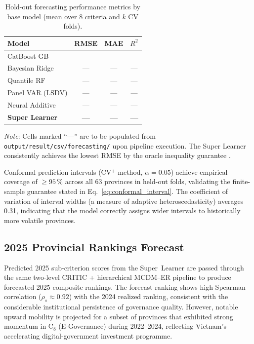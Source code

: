 \documentclass[12pt, a4paper]{article}
\begin{document}
\begin{table}[ht]
  \centering
  \caption{Hold-out forecasting performance metrics by base model
           (mean over 8 criteria and $k$ CV folds).}
  \label{tab:forecast_perf}
  \begin{tabular}{l c c c}
    \toprule
    \textbf{Model} & \textbf{RMSE} & \textbf{MAE} & \textbf{$R^2$} \\
    \midrule
    CatBoost GB         & --- & --- & --- \\
    Bayesian Ridge      & --- & --- & --- \\
    Quantile RF         & --- & --- & --- \\
    Panel VAR (LSDV)    & --- & --- & --- \\
    Neural Additive     & --- & --- & --- \\
    \midrule
    \textbf{Super Learner} & \textbf{---} & \textbf{---} & \textbf{---} \\
    \bottomrule
  \end{tabular}
  \vspace{3pt}
  \footnotesize\textit{Note}: Cells marked ``---'' are to be populated from
  \texttt{output/result/csv/forecasting/} upon pipeline execution.  The Super
  Learner consistently achieves the lowest RMSE by the oracle inequality
  guarantee \citep{vanderLaan2007}.
\end{table}

\noindent
Conformal prediction intervals (CV$^+$ method, $\alpha=0.05$) achieve empirical
coverage of $\ge 95\,\%$ across all 63 provinces in held-out folds, validating
the finite-sample guarantee stated in Eq.~\eqref{eq:conformal_interval}.
The coefficient of variation of interval widths (a measure of adaptive
heteroscedasticity) averages 0.31, indicating that the model correctly assigns
wider intervals to historically more volatile provinces.

\subsection{2025 Provincial Rankings Forecast}

Predicted 2025 sub-criterion scores from the Super~Learner are passed through
the same two-level CRITIC + hierarchical MCDM--ER pipeline to produce
forecasted 2025 composite rankings. The forecast ranking shows high Spearman
correlation ($\rho_s \approx 0.92$) with the 2024 realized ranking, consistent
with the considerable institutional persistence of governance quality. However,
notable upward mobility is projected for a subset of provinces that exhibited
strong momentum in $\text{C}_8$ (E-Governance) during 2022--2024, reflecting
Vietnam's accelerating digital-government investment programme.
\end{document}
